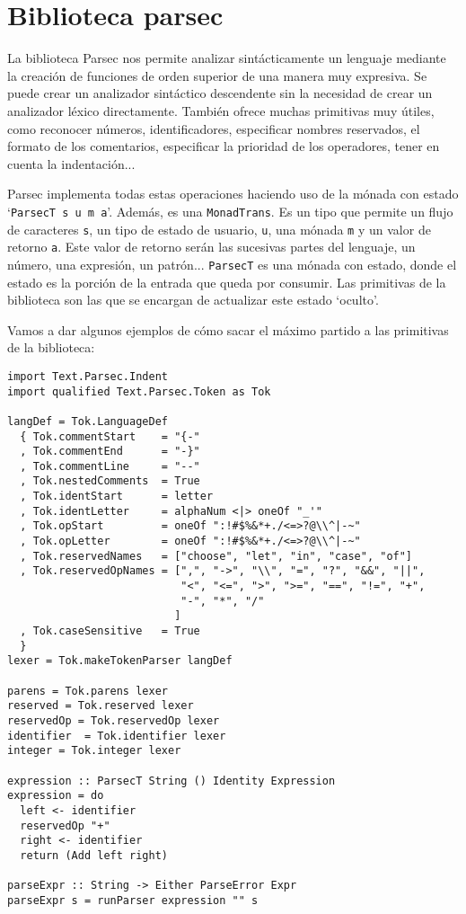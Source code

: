 \documentclass[class=article, crop=false]{standalone}
\begin{document}
\section{Biblioteca parsec}\label{sec:parsec}
La biblioteca Parsec nos permite analizar sintácticamente un lenguaje mediante la creación
de funciones de orden superior de una manera muy expresiva. Se puede crear un analizador
sintáctico descendente sin la necesidad de crear un analizador léxico directamente. También
ofrece muchas primitivas muy útiles, como reconocer números, identificadores, especificar
nombres reservados, el formato de los comentarios, especificar la prioridad de los
operadores, tener en cuenta la indentación...

Parsec implementa todas estas operaciones haciendo uso de la mónada con estado
`\verb`ParsecT s u m a`'. Además, es una \verb`MonadTrans`. Es un tipo que permite un flujo
de caracteres \verb`s`, un tipo de estado de usuario, \verb`u`, una mónada \verb`m` y un
valor de retorno \verb`a`. Este valor de retorno serán las sucesivas partes del lenguaje, un
número, una expresión, un patrón... \verb`ParsecT` es una mónada con estado, donde el estado
es la porción de la entrada que queda por consumir. Las primitivas de la biblioteca son las
que se encargan de actualizar este estado `oculto'.

Vamos a dar algunos ejemplos de cómo sacar el máximo partido a las primitivas de la
biblioteca:

\begin{verbatim}
import Text.Parsec.Indent
import qualified Text.Parsec.Token as Tok

langDef = Tok.LanguageDef
  { Tok.commentStart    = "{-"
  , Tok.commentEnd      = "-}"
  , Tok.commentLine     = "--"
  , Tok.nestedComments  = True
  , Tok.identStart      = letter
  , Tok.identLetter     = alphaNum <|> oneOf "_'"
  , Tok.opStart         = oneOf ":!#$%&*+./<=>?@\\^|-~"
  , Tok.opLetter        = oneOf ":!#$%&*+./<=>?@\\^|-~"
  , Tok.reservedNames   = ["choose", "let", "in", "case", "of"]
  , Tok.reservedOpNames = [",", "->", "\\", "=", "?", "&&", "||",
                           "<", "<=", ">", ">=", "==", "!=", "+",
                           "-", "*", "/"
                          ]
  , Tok.caseSensitive   = True
  }
lexer = Tok.makeTokenParser langDef

parens = Tok.parens lexer
reserved = Tok.reserved lexer
reservedOp = Tok.reservedOp lexer
identifier  = Tok.identifier lexer
integer = Tok.integer lexer

expression :: ParsecT String () Identity Expression
expression = do
  left <- identifier
  reservedOp "+"
  right <- identifier
  return (Add left right)

parseExpr :: String -> Either ParseError Expr
parseExpr s = runParser expression "" s
\end{verbatim}
\end{document}
